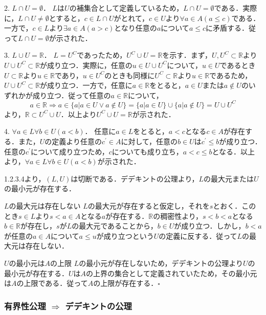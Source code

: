 \documentclass[oneside,openany]{jbook}
\theoremstyle{definition}
\begin{document}
2. $L \cap U = \emptyset$．
$L$は$U$の補集合として定義しているため，$L \cap U = \emptyset$である．実際に，$L \cap U \neq \emptyset$とすると，$c \in L \cap U$がとれて，$c \in U$より$\forall a \in A (a \leq c)$である．一方で，$c \in L$より$\exists a \in A (a > c)$となり任意の$a$について$a \leq c$に矛盾する．従って$L \cap U = \emptyset$が示された．

3. $L \cup U = \mathbb{R}$．
$L=U^{C}$であったため，$U^{C} \cup U = \mathbb{R}$を示す．まず，$U, U^{C} \subset \mathbb{R}$より$U \cup U^{C} \subset \mathbb{R}$が成り立つ．実際に，任意の$u \in U \cup U^{C}$について，$u \in U$であるとき$U \subset \mathbb{R}$より$u \in \mathbb{R}$であり，$u \in U^{C}$のときも同様に$U^{C} \subset \mathbb{R}$より$u \in \mathbb{R}$であるため，$U \cup U^{C} \subset \mathbb{R}$が成り立つ．一方で，任意に$a \in \mathbb{R}$をとると，$a \in U$または$a \notin U$のいずれかが成り立つ．従って任意の$a \in \mathbb{R}$について，$$a \in \mathbb{R} \Rightarrow a \in \{ a | a \in U \lor a \notin U \} = \{ a | a \in U \} \cup \{ a | a \notin U \} = U \cup U^{C}$$より，$\mathbb{R} \subset U^{C} \cup U$．以上より$U^{C} \cup U = \mathbb{R}$が示された．

4. $\forall a \in L \forall b \in U (a < b)$．
任意に$a \in L$をとると，$a < c$となる$c \in A$が存在する．また，$U$の定義より任意の$c^{\prime} \in A$に対して，任意の$b \in U$は$c^{\prime} \leq b$が成り立つ．任意の$c^{\prime}$について成り立つため，$c$についても成り立ち，$a < c \leq b$となる．以上より，$\forall a \in L \forall b \in U (a < b)$が示された．

1.2.3.4より，$(L, U)$は切断である．デデキントの公理より，$L$の最大元または$U$の最小元が存在する．

$L$の最大元は存在しない
$L$の最大元が存在すると仮定し，それを$s$とおく．このとき$s \in L$より$s < a \in A$となる$a$が存在する．$\mathbb{R}$の稠密性より，$s < b < a$となる$b \in \mathbb{R}$が存在し，$s$が$L$の最大元であることから，$b \in U$が成り立つ．しかし，$b < a$が任意の$a \in A$について$a \leq u$が成り立つという$U$の定義に反する．従って$L$の最大元は存在しない．

$U$の最小元は$A$の上限
$L$の最小元が存在しないため，デデキントの公理より$U$の最小元が存在する．$U$は$A$の上界の集合として定義されていたため，その最小元は$A$の上限である．従って$A$の上限が存在する．$\square$

\subsubsection{有界性公理 $\Rightarrow$ デデキントの公理}
\end{document}
